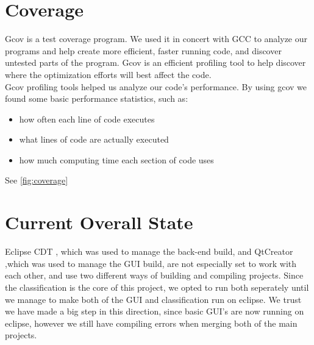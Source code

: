 \documentclass[parskip=full]{scrartcl}
\begin{document}
\section {Coverage}
Gcov is a test coverage program. We used it in concert with GCC to analyze our programs and help create more efficient, faster running code, and discover untested parts of the program. Gcov is an efficient profiling tool to help discover where the optimization efforts will best affect the code.\\
Gcov profiling tools helped us analyze our code's performance. By using gcov we found some basic performance statistics, such as:
\begin{itemize}
	\item how often each line of code executes
	\item what lines of code are actually executed
	\item how much computing time each section of code uses
\end {itemize}


See \ref{fig:coverage}
\pagebreak
\section {Current Overall State}
Eclipse CDT , which was used to manage the back-end build, and QtCreator ,which was used to manage the GUI build, are not especially set to work with each other, and use two different ways of building and compiling projects.
Since the classification is the core of this project, we opted to run both seperately until we manage to make both of the GUI and classification run on eclipse. We trust we have made a big step in this direction, since basic GUI's are now running on eclipse, however we still have compiling errors when merging both of the main projects.
\end{document}

